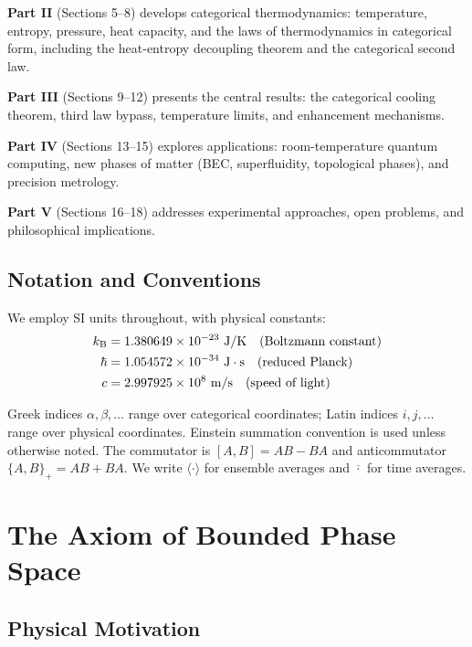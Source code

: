 \textbf{Part II} (Sections 5--8) develops categorical thermodynamics: temperature, entropy, pressure, heat capacity, and the laws of thermodynamics in categorical form, including the heat-entropy decoupling theorem and the categorical second law.

\textbf{Part III} (Sections 9--12) presents the central results: the categorical cooling theorem, third law bypass, temperature limits, and enhancement mechanisms.

\textbf{Part IV} (Sections 13--15) explores applications: room-temperature quantum computing, new phases of matter (BEC, superfluidity, topological phases), and precision metrology.

\textbf{Part V} (Sections 16--18) addresses experimental approaches, open problems, and philosophical implications.

\subsection{Notation and Conventions}

We employ SI units throughout, with physical constants:
\begin{align}
k_{\mathrm{B}} &= 1.380649 \times 10^{-23} \text{ J/K} \quad \text{(Boltzmann constant)} \nonumber \\
\hbar &= 1.054572 \times 10^{-34} \text{ J}\cdot\text{s} \quad \text{(reduced Planck)} \nonumber \\
c &= 2.997925 \times 10^{8} \text{ m/s} \quad \text{(speed of light)} \nonumber
\end{align}

Greek indices $\alpha, \beta, \ldots$ range over categorical coordinates; Latin indices $i, j, \ldots$ range over physical coordinates. Einstein summation convention is used unless otherwise noted. The commutator is $[A, B] = AB - BA$ and anticommutator $\{A, B\}_+ = AB + BA$. We write $\langle \cdot \rangle$ for ensemble averages and $\overline{\cdot}$ for time averages.

\section{The Axiom of Bounded Phase Space}

\subsection{Physical Motivation}

